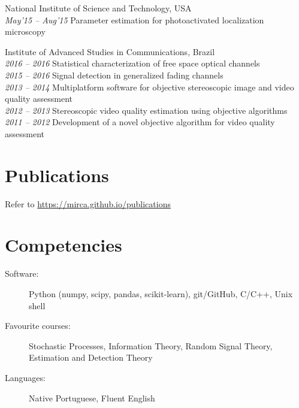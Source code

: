 \documentclass[10pt]{article}
\begin{document}
\begin{titlepage}
    \begin{minipage}[b]{18cm}
    National Institute of Science and Technology, USA\\
        \emph{May'15 -- Aug'15} Parameter estimation for photoactivated localization microscopy
    \end{minipage}

    \begin{minipage}[b]{18cm}
    Institute of Advanced Studies in Communications, Brazil\\
        \emph{2016 -- 2016} Statistical characterization of free space optical channels\\
        \emph{2015 -- 2016} Signal detection in generalized fading channels\\
        \emph{2013 -- 2014} Multiplatform software for objective stereoscopic image and video quality assessment\\
        \emph{2012 -- 2013} Stereoscopic video quality estimation using objective algorithms\\
        \emph{2011 -- 2012} Development of a novel objective algorithm for video quality assessment\\
    \end{minipage}

\section*{Publications}
Refer to \url{https://mirca.github.io/publications}

\section*{Competencies}
\begin{description}
    \item[Software:] Python (numpy, scipy, pandas, scikit-learn), git/GitHub, C/C++, Unix shell
    \item[Favourite courses:] Stochastic Processes, Information Theory, Random Signal Theory, Estimation and Detection Theory
    \item[Languages:] Native Portuguese, Fluent English
\end{description}


\end{titlepage}
\end{document}
